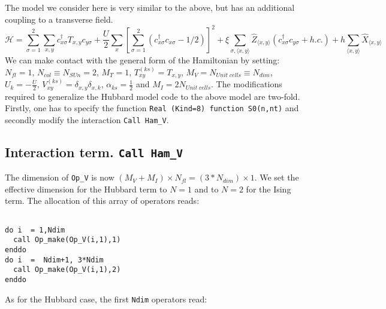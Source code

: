 The model we consider here  is very similar to the  above,  but has an additional coupling to a transverse field. 
\begin{equation}
\label{eqn_hubbard_sun_Ising}
\mathcal{H}=
\sum\limits_{\sigma=1}^{2} 
\sum\limits_{x,y } 
  c^{\dagger}_{x \sigma} T_{x,y}c^{\phantom\dagger}_{y \sigma} 
+ \frac{U}{2}\sum\limits_{x}\left[
\sum\limits_{\sigma=1}^{2}
\left(  c^{\dagger}_{x \sigma} c^{\phantom\dagger}_{x \sigma}  -1/2 \right) \right]^{2}   
+  \xi \sum_{\sigma,\langle x,y \rangle} \hat{Z}_{\langle x,y \rangle}  \left( c^{\dagger}_{x \sigma} c^{\phantom\dagger}_{y \sigma}  + h.c. \right) + h \sum_{\langle x,y \rangle} \hat{X}_{\langle x,y \rangle}
\end{equation}
We can make contact with the general form of the Hamiltonian by setting: 
$N_{fl} = 1$, $N_{col} \equiv N_{SUn}     =2 $,   $M_T    =    1$,  $T^{(ks)}_{x y}   =  T_{x,y}$,  $M_V   =  N_{Unit\; cells} \equiv N_{dim}$,  $U_{k}       =   -\frac{U}{2}$, 
 $V_{x y}^{(ks)} =  \delta_{x,y} \delta_{x,k}$,  $\alpha_{ks}   =  \frac{1}{2}  $ and $M_I       = 2 N_{Unit\; cells} $.
The modifications  required to generalize the Hubbard model code to the above model are two-fold.  Firstly, one has to specify the function \texttt{Real (Kind=8) function S0(n,nt)} and  secondly  modify the interaction \texttt{Call Ham\_V}.


\subsection{Interaction term. \texttt{Call Ham\_V}}
The dimension of   \texttt{Op\_V}  is now  $(M_V + M_I)\times N_{fl}=(3*N_{dim}) \times 1$. 
We set the effective dimension  for the Hubbard term to  $N=1$  and to  $N=2$ for the Ising term. The allocation of this array of operators reads: 

\begin{lstlisting}

do i  = 1,Ndim
  call Op_make(Op_V(i,1),1)
enddo
do i  =  Ndim+1, 3*Ndim
  call Op_make(Op_V(i,1),2)
enddo

\end{lstlisting}
As for the Hubbard case, the first \texttt{Ndim}  operators read: 

